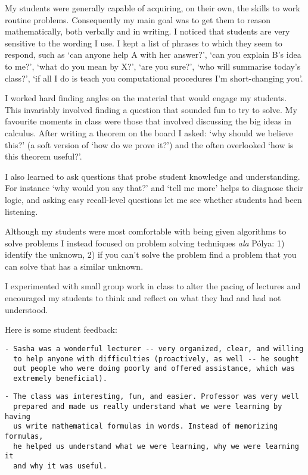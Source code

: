 \documentclass[10,a4paper,sans]{moderncv}
\begin{document}
My students were generally capable of acquiring, on their own, the skills to work routine problems. %
Consequently my main goal 
was to get them to reason mathematically, both verbally and in writing. I noticed that students are very sensitive to the wording I use.
I kept a list of phrases to which they seem to respond, such as  `can anyone help A with her answer?', `can you explain B's idea to me?', `what do you mean by X?',
`are you sure?', `who will summarise today's class?', `if all I do is teach you computational procedures I'm short-changing you'.


I worked hard finding angles on the material that would engage my students. This invariably involved finding a question that
sounded fun to try to solve. My favourite moments in class were those that involved discussing the big ideas in calculus. After writing a theorem on the board I asked: `why should we believe this?' (a soft version of `how do we prove it?') and the often overlooked `how is this theorem useful?'.


I also learned to ask questions that probe student knowledge and understanding. For instance `why would you say that?' and `tell me more' helps to diagnose their logic, and asking easy recall-level questions let me see whether students had been listening.


Although my students were most comfortable with being given algorithms to solve problems I instead focused on problem solving techniques \textit{ala} P\'olya: 1) identify the unknown, 2) if you can't solve the problem find a problem that you can solve that has a similar unknown. 


I experimented with small group work in class to alter the pacing of lectures and encouraged my students to think and reflect on what they had and had not understood.

Here is some student feedback:
\noindent
\begin{verbatim}
- Sasha was a wonderful lecturer -- very organized, clear, and willing 
  to help anyone with difficulties (proactively, as well -- he sought 
  out people who were doing poorly and offered assistance, which was 
  extremely beneficial).
\end{verbatim}

\begin{verbatim}
- The class was interesting, fun, and easier. Professor was very well 
  prepared and made us really understand what we were learning by having 
  us write mathematical formulas in words. Instead of memorizing formulas, 
  he helped us understand what we were learning, why we were learning it 
  and why it was useful. 
\end{verbatim}
\end{document}
